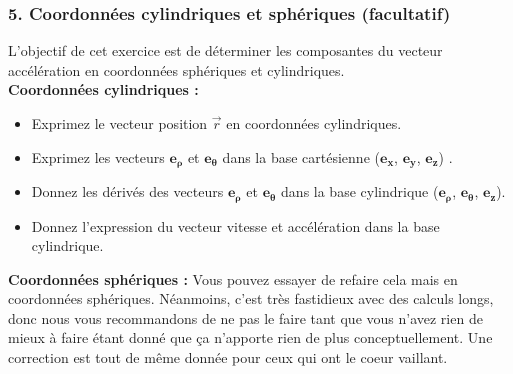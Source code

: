 \documentclass[a4paper,10pt,twoside]{article}
\begin{document}
 
 
 
\subsubsection*{5. Coordonnées cylindriques et sphériques (facultatif)}

\noindent L'objectif de cet exercice est de déterminer les composantes du vecteur accélération en coordonnées sphériques et cylindriques. \\
\textbf{Coordonnées cylindriques : }
\begin{itemize}
    \item Exprimez le vecteur position $\vec r$ en coordonnées cylindriques.
    \item Exprimez les  vecteurs $\mathbf{ e_\rho}$ et  $\mathbf{ e_\theta}$ dans la base cartésienne ($\mathbf{ e_x}$, $\mathbf{ e_y}$, $\mathbf{ e_z}$) .
    \item Donnez les dérivés des vecteurs $\mathbf{ e_\rho}$ et  $\mathbf{ e_\theta}$ dans la base cylindrique ($\mathbf{ e_\rho}$, $\mathbf{ e_\theta}$, $ \mathbf{e_z}$).
    \item Donnez l'expression du vecteur vitesse et accélération dans la base cylindrique.
\end{itemize} 
\textbf{Coordonnées sphériques :} Vous pouvez essayer de refaire cela mais en coordonnées sphériques. Néanmoins, c'est très fastidieux avec des calculs longs, donc nous vous recommandons de ne pas le faire tant que vous n'avez rien de mieux à faire étant donné que ça n'apporte rien de plus conceptuellement. Une correction est tout de même donnée pour ceux qui ont le coeur vaillant. 
\end{document}
